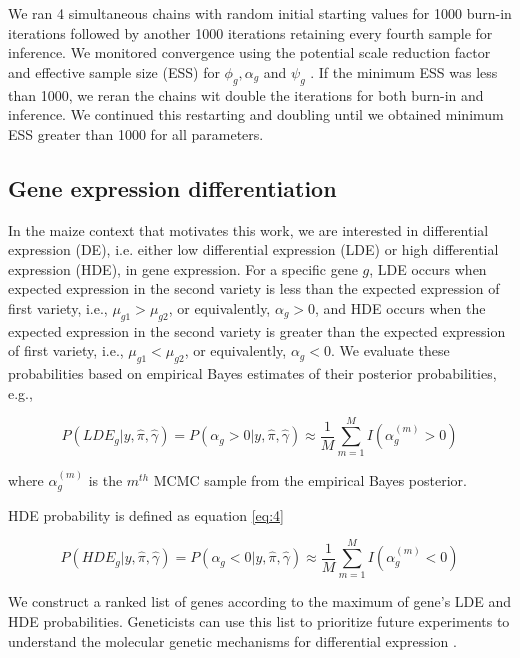 \documentclass[11pt]{isuthesis}
\begin{document}
We ran 4 simultaneous chains with random initial starting values for 1000 burn-in iterations followed by another 1000 iterations retaining every fourth sample for inference. We monitored convergence using the potential scale reduction factor and effective sample size (ESS) for $\phi_g, \alpha_g$ and $\psi_g$ \citep{gelman1992inference}. If the minimum ESS was less than 1000, we reran the chains wit double the iterations for both burn-in and inference. We continued this restarting and doubling until we obtained minimum ESS greater than 1000 for all parameters. 

\subsection{Gene expression differentiation}

In the maize context that motivates this work, we are interested in differential expression (DE), i.e. either low differential expression (LDE) or high differential expression (HDE), in gene expression. For a specific gene $g$, LDE occurs when expected expression in the second variety is less than the expected expression of first variety, i.e., $\mu_{g1} > \mu_{g2}$, or equivalently, $\alpha_g>0$, and HDE occurs when the expected expression in the second variety is greater than the expected expression of first variety, i.e., $\mu_{g1} < \mu_{g2}$, or equivalently, $\alpha_g<0$. We evaluate these probabilities based on empirical Bayes estimates of their posterior probabilities, e.g., 

\begin{equation}
\label{eq:3}
P(LDE_g | y, \hat{\pi}, \hat{\gamma}) = P(\alpha_g>0 | y, \hat{\pi}, \hat{\gamma}) \approx \frac{1}{M} \sum_{m=1}^M I(\alpha_g ^ {(m)}>0)
\end{equation}

where $\alpha_g^{(m)}$ is the $m^{th}$ MCMC sample from the empirical Bayes posterior.

HDE probability is defined as equation \ref{eq:4}

\begin{equation}
\label{eq:4}
P(HDE_g | y, \hat{\pi}, \hat{\gamma}) = P(\alpha_g<0 | y, \hat{\pi}, \hat{\gamma}) \approx \frac{1}{M} \sum_{m=1}^M I(\alpha_g ^ {(m)}<0)
\end{equation}

We construct a ranked list of genes according to the maximum of gene's LDE and HDE probabilities. Geneticists can use this list to prioritize future experiments to understand the molecular genetic mechanisms for differential expression \citep{niemi2015empirical}. 
\end{document}
